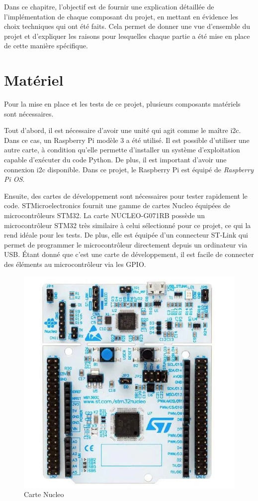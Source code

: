 Dans ce chapitre, l'objectif est de fournir une explication détaillée de l'implémentation de chaque composant du projet, en mettant en évidence les choix techniques qui ont été faits.
Cela permet de donner une vue d'ensemble du projet et d'expliquer les raisons pour lesquelles chaque partie a été mise en place de cette manière spécifique.

\section{Matériel}

Pour la mise en place et les tests de ce projet, plusieurs composants matériels sont nécessaires.

Tout d'abord, il est nécessaire d'avoir une unité qui agit comme le maître \gls{i2c}.
Dans ce cas, un Raspberry Pi modèle 3 a été utilisé.
Il est possible d'utiliser une autre carte, à condition qu'elle permette d'installer un système d'exploitation capable d'exécuter du code Python.
De plus, il est important d'avoir une connexion \gls{i2c} disponible.
Dans ce projet, le Raspberry Pi est équipé de \textit{Raspberry Pi OS}.

Ensuite, des cartes de développement sont nécessaires pour tester rapidement le code.
STMicroelectronics fournit une gamme de cartes Nucleo équipées de microcontrôleurs STM32.
La carte NUCLEO-G071RB possède un microcontrôleur STM32 très similaire à celui sélectionné pour ce projet, ce qui la rend idéale pour les tests.
De plus, elle est équipée d'un connecteur ST-Link qui permet de programmer le microcontrôleur directement depuis un ordinateur via USB.
Étant donné que c'est une carte de développement, il est facile de connecter des éléments au microcontrôleur via les GPIO.

\begin{figure}[H]
    \centering
    \includegraphics[scale=0.2]{./assets/figures/nucleo.jpg}
    \caption{\cite{nucleo} Carte Nucleo}
\end{figure}

